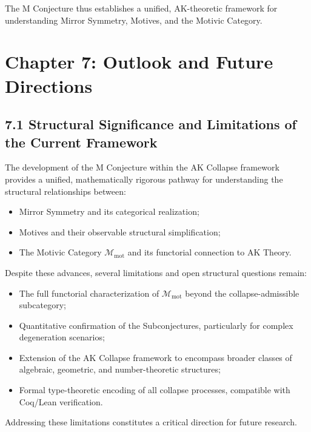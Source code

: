 \documentclass[11pt]{article}
\begin{document}
The M Conjecture thus establishes a unified, AK-theoretic framework for understanding Mirror Symmetry, Motives, and the Motivic Category.

\FloatBarrier




\section{Chapter 7: Outlook and Future Directions}

\subsection{7.1 Structural Significance and Limitations of the Current Framework}

The development of the M Conjecture within the AK Collapse framework provides a unified, mathematically rigorous pathway for understanding the structural relationships between:

\begin{itemize}
    \item Mirror Symmetry and its categorical realization;
    \item Motives and their observable structural simplification;
    \item The Motivic Category $\mathcal{M}_{\mathrm{mot}}$ and its functorial connection to AK Theory.
\end{itemize}

Despite these advances, several limitations and open structural questions remain:

\begin{itemize}
    \item The full functorial characterization of $\mathcal{M}_{\mathrm{mot}}$ beyond the collapse-admissible subcategory;
    \item Quantitative confirmation of the Subconjectures, particularly for complex degeneration scenarios;
    \item Extension of the AK Collapse framework to encompass broader classes of algebraic, geometric, and number-theoretic structures;
    \item Formal type-theoretic encoding of all collapse processes, compatible with Coq/Lean verification.
\end{itemize}

Addressing these limitations constitutes a critical direction for future research.
\end{document}
